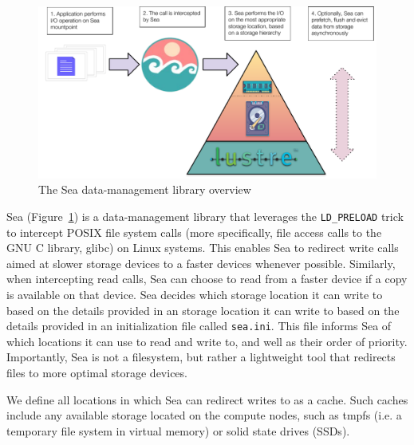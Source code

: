 \documentclass[fleqn,10pt]{wlscirep}
\begin{document}
\begin{figure}

    \centering
    \includegraphics[width=\columnwidth]{figures/sea-diagram.pdf}%
\caption{The Sea data-management library overview}
\label{fig:seaneuro:diagram}
\end{figure}
    Sea (Figure~\ref{fig:seaneuro:diagram}) is a data-management library that leverages
    the \texttt{LD\_PRELOAD}
    trick to intercept POSIX file system calls (more specifically, file access calls to the GNU C library,
    glibc) on Linux systems. This enables Sea to redirect write calls
    aimed at slower storage devices to a faster devices whenever possible.
    Similarly, when intercepting read calls, Sea can choose to read from a
    faster device if a copy is available on that device. Sea decides which
    storage location it can write to based on the details provided in an
    storage location it can write to based on the details provided in an
    initialization file called \texttt{sea.ini}. This file informs Sea of which
    locations it can use to read and write to, and well as their order of
    priority. Importantly, Sea is not a filesystem, but rather a
    lightweight tool that redirects files to more optimal storage devices.

    We define all locations in which Sea can redirect writes to as a cache. Such
    caches include any available storage located on the compute nodes, such as
    tmpfs (i.e. a temporary file system in virtual memory) or solid state drives (SSDs). 
\end{document}
